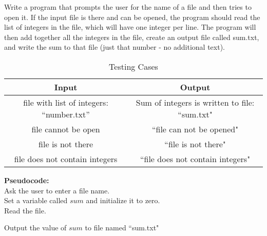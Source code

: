 \documentclass[11pt]{article}
\newenvironment{exercise}[2]{\begin{trivlist}
\item[\hskip \labelsep {\bfseries #1}\hskip \labelsep {\bfseries #2.}]}{\end{trivlist}}
\begin{document}
\begin{exercise}{3B}\\
Write a program that prompts the user for the name of a file and then tries to open it.
If the input file is there and can be opened,
the program should read the list of integers in the file,
which will have one integer per line.
The program will then add together all the integers in the file,
create an output file called sum.txt,
and write the sum to that file (just that number - no additional text).
\begin{table}[H]
\centering
\caption*{Testing Cases}
\label{my-label}
\begin{tabular}{|c|c|}
\hline
Input & Output  \\
\hline
file with list of integers: ``number.txt'' & Sum of integers is written to file: ``sum.txt" \\
\hline
file cannot be open & ``file can not be opened"  \\
\hline
file is not there & ``file is not there" \\
\hline
file does not contain integers & ``file does not contain integers" \\
\hline
\end{tabular}
\end{table}
\noindent
\textbf{Pseudocode:}\\
Ask the user to enter a file name.\\
Set a variable called $sum$ and initialize it to zero.\\
Read the file.\\
\begin{algorithmic}[H]



    \ELSE

    \ENDFOR
    \ENDIF
\end{algorithmic}
Output the value of $sum$ to file named ``sum.txt"\\
\end{exercise}
\end{document}
